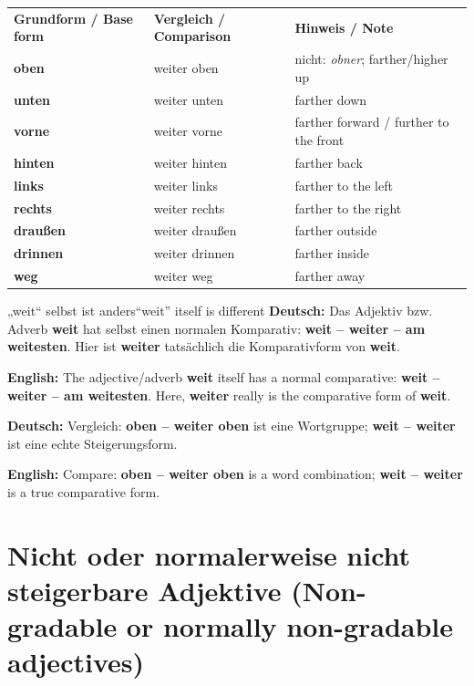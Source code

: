 \documentclass[a4paper,11pt]{article}
\newcommand{\GermanText}[1]{\textbf{Deutsch: }#1\par}
\newcommand{\EnglishText}[1]{{\small\color{SoftGray}\textbf{English: }#1\par}}
\begin{document}
\begin{longtable}{>{\bfseries}p{3.0cm}|p{4.2cm}|p{6.3cm}}
\rowcolor{HeaderBlueDark}
\color{white}\textbf{Grundform / Base form} &
\color{white}\textbf{Vergleich / Comparison} &
\color{white}\textbf{Hinweis / Note} \\
oben & weiter oben & nicht: \textit{obner}; farther/higher up \\
unten & weiter unten & farther down \\
vorne & weiter vorne & farther forward / further to the front \\
hinten & weiter hinten & farther back \\
links & weiter links & farther to the left \\
rechts & weiter rechts & farther to the right \\
draußen & weiter draußen & farther outside \\
drinnen & weiter drinnen & farther inside \\
weg & weiter weg & farther away \\
\end{longtable}

\begin{grammarentry}{„weit“ selbst ist anders}{“weit” itself is different}
\GermanText{Das Adjektiv bzw. Adverb \textbf{weit} hat selbst einen normalen Komparativ: \textbf{weit -- weiter -- am weitesten}. Hier ist \textbf{weiter} tatsächlich die Komparativform von \textbf{weit}.}
\EnglishText{The adjective/adverb \textbf{weit} itself has a normal comparative: \textbf{weit -- weiter -- am weitesten}. Here, \textbf{weiter} really is the comparative form of \textbf{weit}.}

\GermanText{Vergleich: \textbf{oben -- weiter oben} ist eine Wortgruppe; \textbf{weit -- weiter} ist eine echte Steigerungsform.}
\EnglishText{Compare: \textbf{oben -- weiter oben} is a word combination; \textbf{weit -- weiter} is a true comparative form.}
\end{grammarentry}

\section{Nicht oder normalerweise nicht steigerbare Adjektive \textnormal{(Non-gradable or normally non-gradable adjectives)}}
\end{document}
